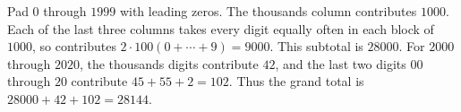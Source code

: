 Pad $0$ through $1999$ with leading zeros. The thousands column contributes $1000$. Each of the last three columns takes every digit equally often in each block of $1000$, so contributes $2\cdot100(0+\cdots+9)=9000$. This subtotal is $28000$. For $2000$ through $2020$, the thousands digits contribute $42$, and the last two digits $00$ through $20$ contribute $45+55+2=102$. Thus the grand total is $28000+42+102=\boxed{28144}$.
